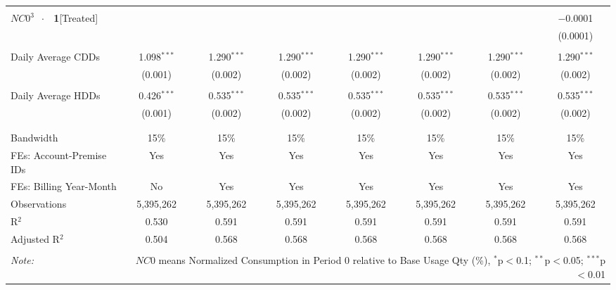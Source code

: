 \begin{table}[!htbp]
\begin{adjustbox}{scale = 0.65}
\begin{tabular}{@{\extracolsep{50pt}}lccccccc}
  & & & & & & & \\ 
 $NC0^{3}$ $\ \cdot \ \ $ \textbf{1}[Treated] &  &  &  &  &  &  & $-$0.0001 \\ 
  &  &  &  &  &  &  & (0.0001) \\ 
  & & & & & & & \\ 
 Daily Average CDDs & 1.098$^{***}$ & 1.290$^{***}$ & 1.290$^{***}$ & 1.290$^{***}$ & 1.290$^{***}$ & 1.290$^{***}$ & 1.290$^{***}$ \\ 
  & (0.001) & (0.002) & (0.002) & (0.002) & (0.002) & (0.002) & (0.002) \\ 
  & & & & & & & \\ 
 Daily Average HDDs & 0.426$^{***}$ & 0.535$^{***}$ & 0.535$^{***}$ & 0.535$^{***}$ & 0.535$^{***}$ & 0.535$^{***}$ & 0.535$^{***}$ \\ 
  & (0.001) & (0.002) & (0.002) & (0.002) & (0.002) & (0.002) & (0.002) \\ 
  & & & & & & & \\ 
\hline \\[-1.8ex] 
Bandwidth & 15\% & 15\% & 15\% & 15\% & 15\% & 15\% & 15\% \\ 
FEs: Account-Premise IDs & Yes & Yes & Yes & Yes & Yes & Yes & Yes \\ 
FEs: Billing Year-Month & No & Yes & Yes & Yes & Yes & Yes & Yes \\ 
Observations & 5,395,262 & 5,395,262 & 5,395,262 & 5,395,262 & 5,395,262 & 5,395,262 & 5,395,262 \\ 
R$^{2}$ & 0.530 & 0.591 & 0.591 & 0.591 & 0.591 & 0.591 & 0.591 \\ 
Adjusted R$^{2}$ & 0.504 & 0.568 & 0.568 & 0.568 & 0.568 & 0.568 & 0.568 \\ 
\hline 
\hline \\[-1.8ex] 
\textit{Note:}  & \multicolumn{7}{r}{$NC0$ means Normalized Consumption in Period 0 relative to Base Usage Qty (\%), $^{*}$p$<$0.1; $^{**}$p$<$0.05; $^{***}$p$<$0.01} \\ 
\end{tabular}
\end{adjustbox}
\end{table} 
